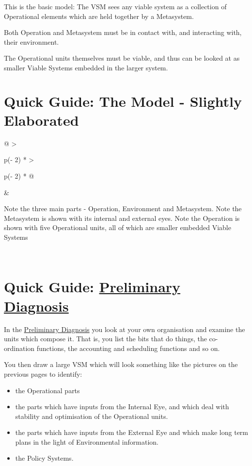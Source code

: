 This is the basic model: The VSM sees any viable system as a collection of Operational elements which are held together by a Metasystem.

Both Operation and Metasystem must be in contact with, and interacting with, their environment.

The Operational units themselves must be viable, and thus can be looked at as smaller Viable Systems embedded in the larger system.

\section*{Quick Guide: The Model - Slightly Elaborated}

\begin{longtable}[]{@{}
        >{\raggedright\arraybackslash}p{(\columnwidth - 2\tabcolsep) * }
        >{\raggedright\arraybackslash}p{(\columnwidth - 2\tabcolsep) * }@{}}
    & \begin{minipage}[c]{\linewidth}\raggedright
       Note the three main parts - Operation, Environment and Metasystem.
       \vspace{\baselineskip}
       Note the Metasystem is shown with its internal and external eyes.
       \vspace{\baselineskip}
       Note the Operation is shown with five Operational units, all of which are smaller embedded Viable Systems
    \end{minipage} \\
\end{longtable}

\section*{Quick Guide: \href{https://vsmg.lrc.org.uk/3pd_5sys.html}{Preliminary Diagnosis}}
In the \href{https://vsmg.lrc.org.uk/3pd_5sys.html}{Preliminary Diagnosis} you look at your own organisation and examine the units which compose it. That is, you list the bits that do things, the co-ordination functions, the accounting and scheduling functions and so on.

You then draw a large VSM which will look something like the pictures on the previous pages to identify:

\begin{itemize}
  \item the Operational parts

  \item the parts which have inputs from the Internal Eye, and which deal with stability and optimisation of the Operational units.

  \item the parts which have inputs from the External Eye and which make long term plans in the light of Environmental information.

  \item the Policy Systems.

\end{itemize}


